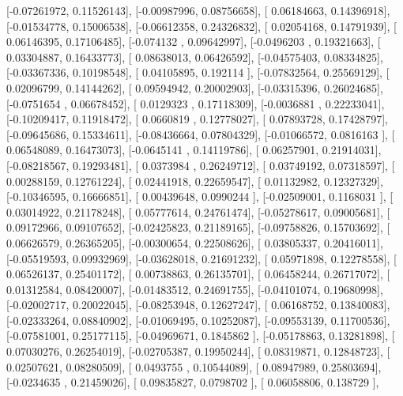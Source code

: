 \documentclass{article}
\begin{document}
       [-0.07261972,  0.11526143],
       [-0.00987996,  0.08756658],
       [ 0.06184663,  0.14396918],
       [-0.01534778,  0.15006538],
       [-0.06612358,  0.24326832],
       [ 0.02054168,  0.14791939],
       [ 0.06146395,  0.17106485],
       [-0.074132  ,  0.09642997],
       [-0.0496203 ,  0.19321663],
       [ 0.03304887,  0.16433773],
       [ 0.08638013,  0.06426592],
       [-0.04575403,  0.08334825],
       [-0.03367336,  0.10198548],
       [ 0.04105895,  0.192114  ],
       [-0.07832564,  0.25569129],
       [ 0.02096799,  0.14144262],
       [ 0.09594942,  0.20002903],
       [-0.03315396,  0.26024685],
       [-0.0751654 ,  0.06678452],
       [ 0.0129323 ,  0.17118309],
       [-0.0036881 ,  0.22233041],
       [-0.10209417,  0.11918472],
       [ 0.0660819 ,  0.12778027],
       [ 0.07893728,  0.17428797],
       [-0.09645686,  0.15334611],
       [-0.08436664,  0.07804329],
       [-0.01066572,  0.0816163 ],
       [ 0.06548089,  0.16473073],
       [-0.0645141 ,  0.14119786],
       [ 0.06257901,  0.21914031],
       [-0.08218567,  0.19293481],
       [ 0.0373984 ,  0.26249712],
       [ 0.03749192,  0.07318597],
       [ 0.00288159,  0.12761224],
       [ 0.02441918,  0.22659547],
       [ 0.01132982,  0.12327329],
       [-0.10346595,  0.16666851],
       [ 0.00439648,  0.0990244 ],
       [-0.02509001,  0.1168031 ],
       [ 0.03014922,  0.21178248],
       [ 0.05777614,  0.24761474],
       [-0.05278617,  0.09005681],
       [ 0.09172966,  0.09107652],
       [-0.02425823,  0.21189165],
       [-0.09758826,  0.15703692],
       [ 0.06626579,  0.26365205],
       [-0.00300654,  0.22508626],
       [ 0.03805337,  0.20416011],
       [-0.05519593,  0.09932969],
       [-0.03628018,  0.21691232],
       [ 0.05971898,  0.12278558],
       [ 0.06526137,  0.25401172],
       [ 0.00738863,  0.26135701],
       [ 0.06458244,  0.26717072],
       [ 0.01312584,  0.08420007],
       [-0.01483512,  0.24691755],
       [-0.04101074,  0.19680998],
       [-0.02002717,  0.20022045],
       [-0.08253948,  0.12627247],
       [ 0.06168752,  0.13840083],
       [-0.02333264,  0.08840902],
       [-0.01069495,  0.10252087],
       [-0.09553139,  0.11700536],
       [-0.07581001,  0.25177115],
       [-0.04969671,  0.1845862 ],
       [-0.05178863,  0.13281898],
       [ 0.07030276,  0.26254019],
       [-0.02705387,  0.19950244],
       [ 0.08319871,  0.12848723],
       [ 0.02507621,  0.08280509],
       [ 0.0493755 ,  0.10544089],
       [ 0.08947989,  0.25803694],
       [-0.0234635 ,  0.21459026],
       [ 0.09835827,  0.0798702 ],
       [ 0.06058806,  0.138729  ],
\end{document}
